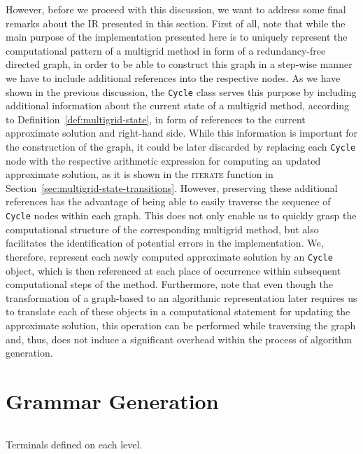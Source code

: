 However, before we proceed with this discussion, we want to address some final remarks about the IR presented in this section.
First of all, note that while the main purpose of the implementation presented here is to uniquely represent the computational pattern of a multigrid method in form of a redundancy-free directed graph, in order to be able to construct this graph in a step-wise manner we have to include additional references into the respective nodes.
As we have shown in the previous discussion, the \texttt{Cycle} class serves this purpose by including additional information about the current state of a multigrid method, according to Definition~\ref{def:multigrid-state}, in form of references to the current approximate solution and right-hand side.
While this information is important for the construction of the graph, it could be later discarded by replacing each \texttt{Cycle} node with the respective arithmetic expression for computing an updated approximate solution, as it is shown in the \textsc{iterate} function in Section~\ref{sec:multigrid-state-transitions}.
However, preserving these additional references has the advantage of being able to easily traverse the sequence of \texttt{Cycle} nodes within each graph.
This does not only enable us to quickly grasp the computational structure of the corresponding multigrid method, but also facilitates the identification of potential errors in the implementation.
We, therefore, represent each newly computed approximate solution by an \texttt{Cycle} object, which is then referenced at each place of occurrence within subsequent computational steps of the method.
Furthermore, note that even though the transformation of a graph-based to an algorithmic representation later requires us to translate each of these objects in a computational statement for updating the approximate solution, this operation can be performed while traversing the graph and, thus, does not induce a significant overhead within the process of algorithm generation. 
\section{Grammar Generation}
\begin{listing}
	\inputminted{python}{evostencils/grammar/terminals.py}
	\caption{Terminals defined on each level.}
	\label{code:grammar:terminals.py}
\end{listing}
